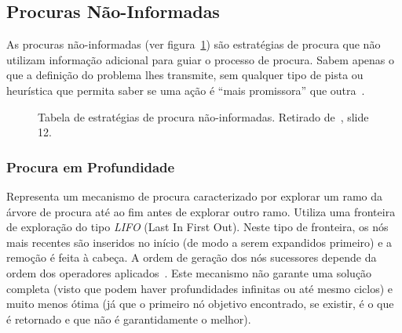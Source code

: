 \subsection{Procuras Não-Informadas}\label{subsec:procuras-nao-informadas}

As procuras não-informadas (ver figura~\ref{fig:tabela-estrategias-procura-nao-informadas}) são estratégias de procura que não utilizam informação adicional para guiar o processo de procura.
Sabem apenas o que a definição do problema lhes transmite, sem qualquer tipo de pista ou heurística que permita saber se uma ação é ``mais promissora'' que outra~\cite{ist:leic:resumos:procura-cega}.

\begin{figure}[H]
    \begin{center}
    \end{center}
    \caption{Tabela de estratégias de procura não-informadas.
    Retirado de~\cite{isel:iasa:slides:proc-espaco-estados-parte-2}, slide 12.}
    \label{fig:tabela-estrategias-procura-nao-informadas}
\end{figure}

\subsubsection{Procura em Profundidade}\label{subsubsec:procura-profundidade}

Representa um mecanismo de procura caracterizado por explorar um ramo da árvore de procura até ao fim antes de explorar outro ramo.
Utiliza uma fronteira de exploração do tipo \textit{LIFO} (Last In First Out).
Neste tipo de fronteira, os nós mais recentes são inseridos no início (de modo a serem expandidos primeiro) e a remoção é feita à cabeça.
A ordem de geração dos nós sucessores depende da ordem dos operadores aplicados~\cite{isel:iasa:slides:proc-espaco-estados-parte-1}.
Este mecanismo não garante uma solução completa (visto que podem haver profundidades infinitas ou até mesmo ciclos) e muito menos ótima (já que o primeiro nó objetivo encontrado, se existir, é o que é retornado e que não é garantidamente o melhor).


